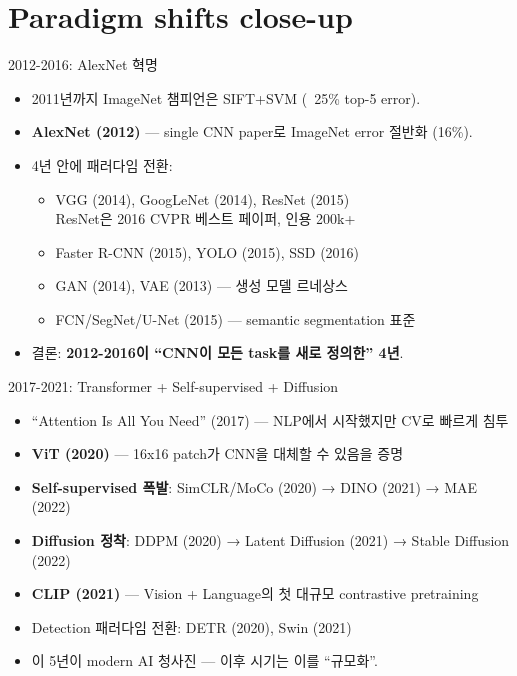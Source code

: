 \documentclass[aspectratio=169,t]{beamer}
\newcommand{\hot}[1]{\textcolor{accentorange}{\textbf{#1}}}
\newcommand{\cool}[1]{\textcolor{accentblue}{\textbf{#1}}}
\newcommand{\muted}[1]{\textcolor{mutedgray}{#1}}
\begin{document}
\section{Paradigm shifts close-up}

\begin{frame}{2012-2016: AlexNet 혁명}
\begin{itemize}
  \item 2011년까지 ImageNet 챔피언은 SIFT+SVM (~25\% top-5 error).
  \item \hot{AlexNet (2012)} — single CNN paper로 ImageNet error 절반화 (16\%).
  \item 4년 안에 패러다임 전환:
  \begin{itemize}
    \item VGG (2014), GoogLeNet (2014), ResNet (2015) \\
          \muted{ResNet은 2016 CVPR 베스트 페이퍼, 인용 200k+}
    \item Faster R-CNN (2015), YOLO (2015), SSD (2016)
    \item GAN (2014), VAE (2013) — 생성 모델 르네상스
    \item FCN/SegNet/U-Net (2015) — semantic segmentation 표준
  \end{itemize}
  \item 결론: \cool{2012-2016이 ``CNN이 모든 task를 새로 정의한'' 4년}.
\end{itemize}
\end{frame}

\begin{frame}{2017-2021: Transformer + Self-supervised + Diffusion}
\begin{itemize}
  \item ``Attention Is All You Need'' (2017) — NLP에서 시작했지만 CV로 빠르게 침투
  \item \hot{ViT (2020)} — 16x16 patch가 CNN을 대체할 수 있음을 증명
  \item \cool{Self-supervised 폭발}: SimCLR/MoCo (2020) → DINO (2021) → MAE (2022)
  \item \cool{Diffusion 정착}: DDPM (2020) → Latent Diffusion (2021) → Stable Diffusion (2022)
  \item \cool{CLIP (2021)} — Vision + Language의 첫 대규모 contrastive pretraining
  \item Detection 패러다임 전환: DETR (2020), Swin (2021)
  \item \muted{이 5년이 modern AI 청사진 — 이후 시기는 이를 ``규모화''.}
\end{itemize}
\end{frame}
\end{document}
